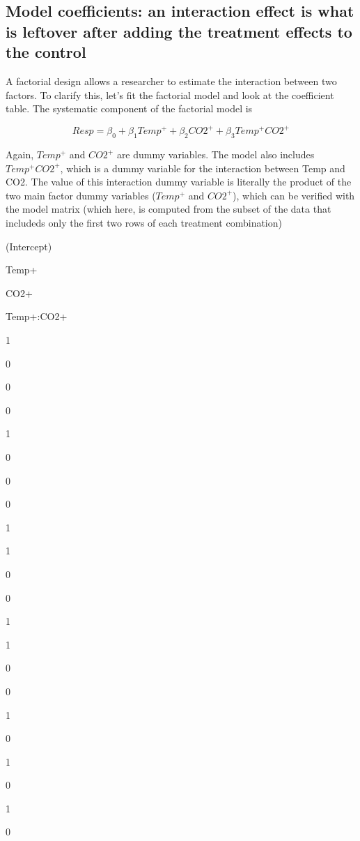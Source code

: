 \documentclass[]{book}
\begin{document}
\subsection{Model coefficients: an interaction effect is what is
leftover after adding the treatment effects to the
control}\label{model-coefficients-an-interaction-effect-is-what-is-leftover-after-adding-the-treatment-effects-to-the-control}

A factorial design allows a researcher to estimate the interaction
between two factors. To clarify this, let's fit the factorial model and
look at the coefficient table. The systematic component of the factorial
model is

\begin{equation}
Resp = \beta_0 + \beta_1 Temp^+ + \beta_2 CO2^+ + \beta_3 Temp^+ CO2^+
\label{eq:factorial-full}
\end{equation}

Again, \(Temp^+\) and \(CO2^+\) are dummy variables. The model also
includes \(Temp^+ CO2^+\), which is a dummy variable for the interaction
between Temp and CO2. The value of this interaction dummy variable is
literally the product of the two main factor dummy variables (\(Temp^+\)
and \(CO2^+\)), which can be verified with the model matrix (which here,
is computed from the subset of the data that includeds only the first
two rows of each treatment combination)

(Intercept)

Temp+

CO2+

Temp+:CO2+

1

0

0

0

1

0

0

0

1

1

0

0

1

1

0

0

1

0

1

0

1

0
\end{document}
